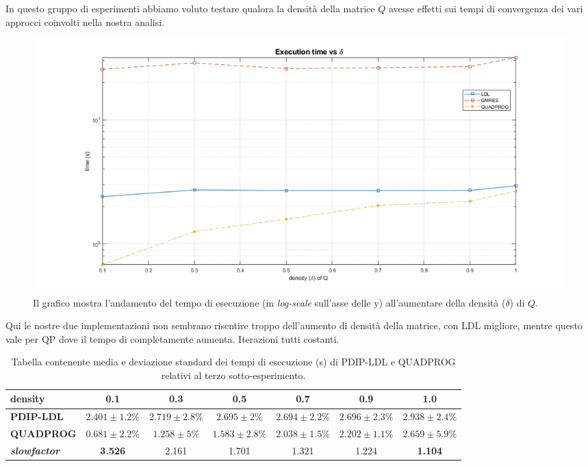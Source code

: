  In questo gruppo di esperimenti abbiamo voluto testare qualora la densità della matrice $Q$ avesse effetti sui tempi di convergenza dei vari approcci coinvolti nella nostra analisi.

\begin{figure}[h]
    \centering
    \includegraphics[width=\textwidth]{img/MU4.png}
    \caption{Il grafico mostra l'andamento del tempo di esecuzione (in \textit{log-scale} sull'asse delle y) all'aumentare della densità ($\delta$) di $Q$. \label{fig:exp3.1}}
\end{figure}
 
 Qui le nostre due implementazioni non sembrano risentire troppo dell'aumento di densità della matrice, con LDL migliore, mentre questo vale per QP dove il tempo di completamente aumenta. Iterazioni tutti costanti.


\begin{table}[!h]
\centering
\begin{tabular}{l|c|c|c|c|c|c}
\textbf{density}                     & \textbf{0.1} & \textbf{0.3} & \textbf{0.5} & \textbf{0.7} & \textbf{0.9} & \textbf{1.0} \\ \hline
\textbf{PDIP-LDL}                    & $2.401 \pm 1.2\%$       & $2.719 \pm 2.8\%$       & $2.695  \pm 2\%$       & $2.694 \pm 2.2\%$       & $2.696 \pm 2.3\%$       & $2.938  \pm 2.4\%$       \\
\textbf{QUADPROG}                    & $0.681  \pm 2.2\%$      & $1.258  \pm 5\%$       & $1.583 \pm 2.8\%$       & $2.038 \pm 1.5\%$       & $2.202 \pm 1.1\%$       & $2.659 \pm 5.9\%$       \\
\textbf{\textit{slowfactor}} & \textbf{3.526}       & 2.161       & 1.701       & 1.321       & 1.224       & \textbf{1.104}
\end{tabular}
\caption{Tabella contenente media e deviazione standard dei tempi di esecuzione (s) di PDIP-LDL e QUADPROG relativi al terzo sotto-esperimento. \label{tab:ldlqp3}}
\end{table}


